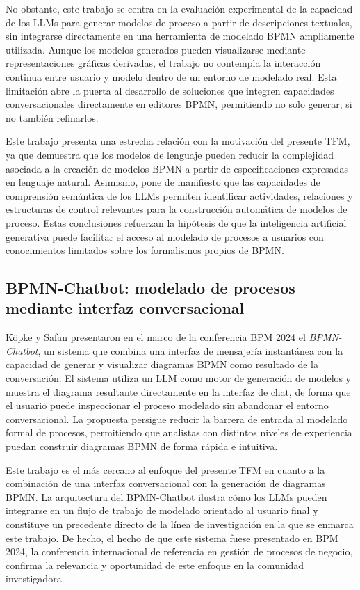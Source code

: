 No obstante, este trabajo se centra en la evaluación experimental de la capacidad de los LLMs para generar modelos 
de proceso a partir de descripciones textuales, sin integrarse directamente en una herramienta de modelado BPMN ampliamente utilizada. 
Aunque los modelos generados pueden visualizarse mediante representaciones gráficas derivadas, el trabajo no contempla la interacción 
continua entre usuario y modelo dentro de un entorno de modelado real. Esta limitación abre la puerta al desarrollo de soluciones que integren 
capacidades conversacionales directamente en editores BPMN, permitiendo no solo generar, si no también refinarlos.

Este trabajo presenta una estrecha relación con la motivación del presente TFM, ya que demuestra que los modelos de lenguaje 
pueden reducir la complejidad asociada a la creación de modelos BPMN a partir de especificaciones expresadas en lenguaje natural. Asimismo, pone
de manifiesto que las capacidades de comprensión semántica de los LLMs permiten identificar actividades, relaciones y estructuras de control 
relevantes para la construcción automática de modelos de proceso. Estas conclusiones refuerzan la hipótesis de que la inteligencia 
artificial generativa puede facilitar el acceso al modelado de procesos a usuarios con conocimientos limitados sobre 
los formalismos propios de BPMN. 

\subsection{BPMN-Chatbot: modelado de procesos mediante interfaz conversacional}

Köpke y Safan \cite{fillies2024} presentaron en el marco de la conferencia BPM 2024 el \textit{BPMN-Chatbot}, un sistema que combina una interfaz 
de mensajería instantánea con la capacidad de generar y visualizar diagramas BPMN como resultado de la conversación. El sistema utiliza un LLM 
como motor de generación de modelos y muestra el diagrama resultante directamente en la interfaz de chat, de forma que el usuario puede 
inspeccionar el proceso modelado sin abandonar el entorno conversacional. La propuesta persigue reducir la barrera de entrada al modelado formal 
de procesos, permitiendo que analistas con distintos niveles de experiencia puedan construir diagramas BPMN de forma rápida e intuitiva.

Este trabajo es el más cercano al enfoque del presente TFM en cuanto a la combinación de una interfaz conversacional con la 
generación de diagramas BPMN. La arquitectura del BPMN-Chatbot ilustra cómo los LLMs pueden integrarse en un flujo de trabajo de 
modelado orientado al usuario final y constituye un precedente directo de la línea de investigación en la que se enmarca este trabajo. 
De hecho, el hecho de que este sistema fuese presentado en BPM 2024, la conferencia internacional de referencia en gestión de procesos de 
negocio, confirma la relevancia y oportunidad de este enfoque en la comunidad investigadora.

